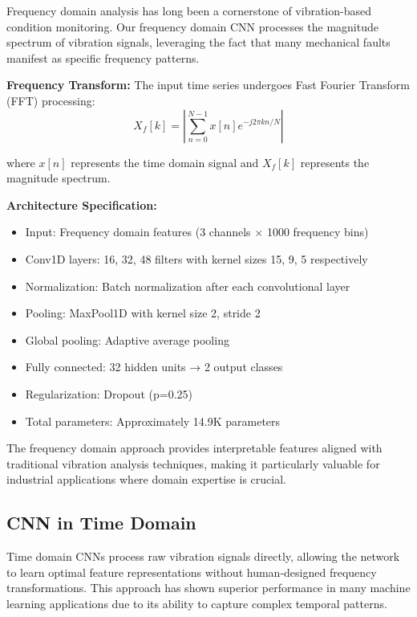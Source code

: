 \documentclass[12pt]{article}
\begin{document}
Frequency domain analysis has long been a cornerstone of vibration-based condition monitoring. Our frequency domain CNN processes the magnitude spectrum of vibration signals, leveraging the fact that many mechanical faults manifest as specific frequency patterns.

\textbf{Frequency Transform:}
The input time series undergoes Fast Fourier Transform (FFT) processing:
\begin{equation}
X_f[k] = \left| \sum_{n=0}^{N-1} x[n] e^{-j2\pi kn/N} \right|
\end{equation}

where $x[n]$ represents the time domain signal and $X_f[k]$ represents the magnitude spectrum.

\textbf{Architecture Specification:}
\begin{itemize}
    \item Input: Frequency domain features (3 channels $\times$ 1000 frequency bins)
    \item Conv1D layers: 16, 32, 48 filters with kernel sizes 15, 9, 5 respectively
    \item Normalization: Batch normalization after each convolutional layer
    \item Pooling: MaxPool1D with kernel size 2, stride 2
    \item Global pooling: Adaptive average pooling
    \item Fully connected: 32 hidden units → 2 output classes
    \item Regularization: Dropout (p=0.25)
    \item Total parameters: Approximately 14.9K parameters
\end{itemize}

The frequency domain approach provides interpretable features aligned with traditional vibration analysis techniques, making it particularly valuable for industrial applications where domain expertise is crucial.

\subsection{CNN in Time Domain}

Time domain CNNs process raw vibration signals directly, allowing the network to learn optimal feature representations without human-designed frequency transformations. This approach has shown superior performance in many machine learning applications due to its ability to capture complex temporal patterns.
\end{document}

